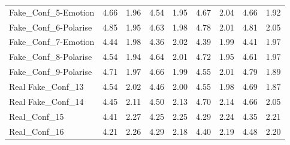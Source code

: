 \documentclass[empirical, authordate]{jote-new-article}
\begin{document}
\begin{table}
\begin{tabularx}{\linewidth}{@{} X  S S S S | S S S S@{}}
    Fake\_Conf\_5-Emotion   & 4.66                                           & 1.96                                         & 4.54           & 1.95            & 4.67          & 2.04           & 4.66           & 1.92            \\
    Fake\_Conf\_6-Polarise  & 4.85                                           & 1.95                                         & 4.63           & 1.98            & 4.78          & 2.01           & 4.81           & 2.05            \\
    Fake\_Conf\_7-Emotion   & 4.44                                           & 1.98                                         & 4.36           & 2.02            & 4.39          & 1.99           & 4.41           & 1.97            \\
    Fake\_Conf\_8-Polarise  & 4.54                                           & 1.94                                         & 4.64           & 2.01            & 4.72          & 1.95           & 4.61           & 1.97            \\
    Fake\_Conf\_9-Polarise  & 4.71                                           & 1.97                                         & 4.66           & 1.99            & 4.55          & 2.01           & 4.79           & 1.89            \\
    Real Fake\_Conf\_13     & 4.54                                           & 2.02                                         & 4.46           & 2.00            & 4.55          & 1.98           & 4.69           & 1.87            \\
    Real Fake\_Conf\_14     & 4.45                                           & 2.11                                         & 4.50           & 2.13            & 4.70          & 2.14           & 4.66           & 2.05            \\
    Real\_Conf\_15          & 4.41                                           & 2.27                                         & 4.25           & 2.25            & 4.29          & 2.24           & 4.35           & 2.21            \\
    Real\_Conf\_16          & 4.21                                           & 2.26                                         & 4.29           & 2.18            & 4.40          & 2.19           & 4.48           & 2.20            \\
    \bottomrule
  \end{tabularx}



\end{table}
\end{document}

